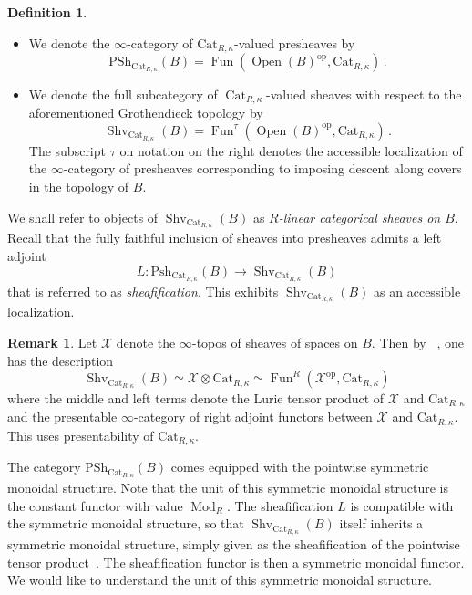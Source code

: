 \documentclass[10pt]{amsart}
\newcommand{\longto}{\longrightarrow}
\theoremstyle{plain}
\theoremstyle{definition}
\newtheorem{definition}[theorem]{Definition}
\newtheorem{rmk}[theorem]{Remark}
\DeclareMathOperator{\Mod}{Mod}
\DeclareMathOperator{\Shv}{Shv}
\DeclareMathOperator{\Fun}{Fun}
\DeclareMathOperator{\Open}{Open}
\DeclareMathOperator{\Cat}{Cat}
\newcommand{\oop}{\mathrm{op}}
\begin{document}
\begin{definition}
    \leavevmode
    \begin{itemize}
      \item We denote the $\infty$-category of $\mathrm{Cat}_{R, \kappa}$-valued presheaves by
      \[
   \mathrm{PSh}_{\mathrm{Cat}_{R, \kappa}}(B) = \Fun(\Open(B)^{\oop},\mathrm{Cat}_{R, \kappa} ) \,.
      \]
      \item We denote the full subcategory of $\Cat_{R,\kappa}$-valued sheaves with respect to the aforementioned Grothendieck topology  by
       \[
       \Shv_{\Cat_{R, \kappa}}(B) = \Fun^{\tau }( \Open(B)^{\oop},\mathrm{Cat}_{R, \kappa}) \,.
       \]
       The subscript $\tau$ on notation on the right denotes the accessible localization of the $\infty$-category of presheaves corresponding to imposing descent along covers in the topology of $B$.
    \end{itemize}
\end{definition}

We shall refer to objects of $\Shv_{\mathrm{Cat}_{R, \kappa}}(B)$ as \emph{$R$-linear categorical sheaves on $B$}.
Recall that the fully faithful inclusion of sheaves into presheaves admits a left adjoint
\[
L : \mathrm{Psh}_{\mathrm{Cat}_{R, \kappa}}(B)  \longto \Shv_{\mathrm{Cat}_{R, \kappa}}(B)
\]
that is referred to as \emph{sheafification}.
This exhibits $\Shv_{\mathrm{Cat}_{R, \kappa}}(B)$  as an accessible localization.

\begin{rmk} \label{alternatedescriptionofsheaves}
Let $\mathcal{X}$ denote the $\infty$-topos of sheaves of spaces on $B$.
Then by ~\cite[Proposition 4.8.1.17]{HA}, one has the description
$$
\Shv_{\mathrm{Cat}_{R, \kappa}}(B) \simeq \mathcal{X} \otimes \mathrm{Cat}_{R, \kappa} \simeq \Fun^{R}( \mathcal{X}^{\oop}, \mathrm{Cat}_{R, \kappa})
$$
where the middle and left terms denote the Lurie tensor product of $\mathcal{X}$ and $\mathrm{Cat}_{R, \kappa}$  and the presentable $\infty$-category of right adjoint functors between $\mathcal{X}$ and $\mathrm{Cat}_{R, \kappa}$.
This uses presentability of $\mathrm{Cat}_{R, \kappa}$.
\end{rmk}

The category $\mathrm{PSh}_{\mathrm{Cat}_{R, \kappa}}(B)$ comes equipped with the pointwise symmetric monoidal structure.
Note that the unit of this symmetric monoidal structure is the constant functor with value $\Mod_R$.
The sheafification $L$ is compatible with the symmetric monoidal structure, so that $\Shv_{\mathrm{Cat}_{R, \kappa}}(B)$ itself inherits a symmetric monoidal structure, simply given as the sheafification of the pointwise tensor product~\cite[Proposition 1.3.4.6]{SAG}.
The sheafification functor is then a symmetric monoidal functor.
We would like to understand the unit of this symmetric monoidal structure.
\end{document}
